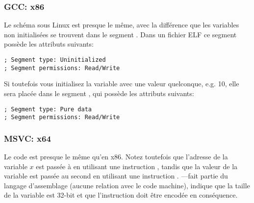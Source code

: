 \subsubsection{GCC: x86}

Le schéma sous Linux est presque le même, avec la différence que les variables
non initialisées se trouvent dans le segment .
Dans un fichier \ac{ELF} ce segment possède les attributs suivants:

\begin{lstlisting}
; Segment type: Uninitialized
; Segment permissions: Read/Write
\end{lstlisting}

Si toutefois vous initialisez la variable avec une valeur quelconque, e.g. 10,
elle sera placée dans le segment , qui possède les attributs suivants:

\begin{lstlisting}
; Segment type: Pure data
; Segment permissions: Read/Write
\end{lstlisting}

\subsubsection{MSVC: x64}



Le code est presque le même qu'en x86.
Notez toutefois que l'adresse de la variable $x$ est passée à  en utilisant
une instruction \LEA, tandis que la valeur de la variable est passée au second \printf
en utilisant une instruction \MOV.
---fait partie du langage d'assemblage (aucune relation avec le code machine),
indique que la taille de la variable est 32-bit et que l'instruction \MOV doit être
encodée en conséquence.

